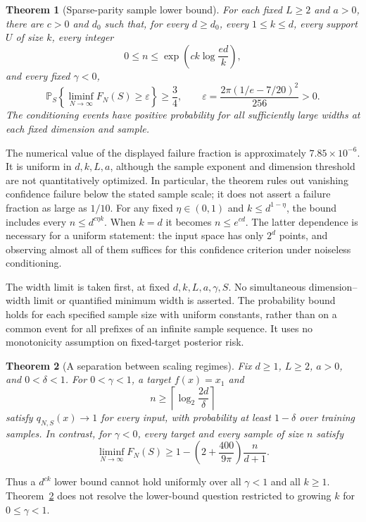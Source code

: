 \documentclass[11pt]{article}
\newtheorem{theorem}{Theorem}[section]
\theoremstyle{remark}\newtheorem{remark}[theorem]{Remark}
\begin{document}
\begin{theorem}[Sparse-parity sample lower bound]\label{thm:main}
For each fixed $L\ge2$ and $a>0$, there are $c>0$ and $d_0$
such that, for every $d\ge d_0$, every $1\le k\le d$, every
support $U$ of size $k$, every integer
\[
 0\le n\le\exp\!\left(c k\log\frac{ed}{k}\right),
\]
and every fixed $\gamma<0$,
\[
 \mathbb P_S\left\{\liminf_{N\to\infty}F_N(S)
          \ge\varepsilon\right\}\ge\frac34,
 \qquad
 \varepsilon=\frac{2\pi(1/e-7/20)^2}{256}>0.
\]
The conditioning events have positive probability for all sufficiently
large widths at each fixed dimension and sample.
\end{theorem}

The numerical value of the displayed failure fraction is approximately
$7.85\times10^{-6}$. It is uniform in $d,k,L,a$, although the sample
exponent and dimension threshold are not quantitatively optimized.
In particular, the theorem rules out vanishing confidence failure below
the stated sample scale; it does not assert a failure fraction as large
as $1/10$.
For any fixed $\eta\in(0,1)$ and $k\le d^{1-\eta}$, the bound
includes every $n\le d^{c\eta k}$. When $k=d$ it becomes
$n\le e^{cd}$. The latter dependence is necessary for a uniform
statement: the input space has only $2^d$ points, and observing almost
all of them suffices for this confidence criterion under noiseless
conditioning.

The width limit is taken first, at fixed $d,k,L,a,\gamma,S$.
No simultaneous dimension--width limit or quantified minimum width is
asserted. The probability bound holds for each specified sample size
with uniform constants, rather than on a common event for all prefixes
of an infinite sample sequence. It uses no monotonicity assumption on
fixed-target posterior risk.

\begin{theorem}[A separation between scaling regimes]
\label{thm:separation}
Fix $d\ge1$, $L\ge2$, $a>0$, and $0<\delta<1$.
For $0<\gamma<1$, a target $f(x)=x_1$ and
\[
 n\ge\left\lceil\log_2\frac{2d}{\delta}\right\rceil
\]
satisfy $q_{N,S}(x)\to1$ for every input, with probability at least
$1-\delta$ over training samples. In contrast, for $\gamma<0$,
every target and every sample of size $n$ satisfy
\[
 \liminf_{N\to\infty}F_N(S)
 \ge1-\left(2+\frac{400}{9\pi}\right)\frac{n}{d+1}.
\]
\end{theorem}

Thus a $d^{c k}$ lower bound cannot hold uniformly over all
$\gamma<1$ and all $k\ge1$.
Theorem~\ref{thm:separation} does not resolve the lower-bound question
restricted to growing $k$ for $0\le\gamma<1$.
\end{document}
